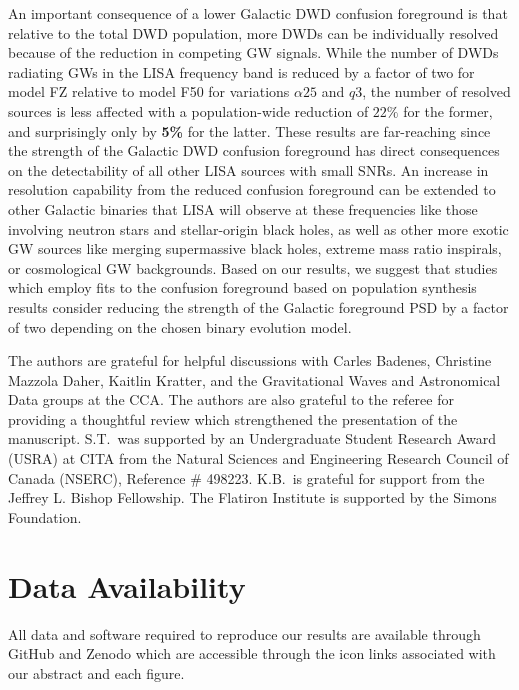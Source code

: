 \documentclass[twocolumn, linenumbers]{aastex631}
\begin{document}
An important consequence of a lower Galactic DWD confusion foreground is that relative to the total DWD population, more DWDs can be individually resolved because of the reduction in competing GW signals. While the number of DWDs radiating GWs in the LISA frequency band is reduced by a factor of two for model FZ relative to model F50 for variations $\alpha25$ and $q3$, the number of resolved sources is less affected with a population-wide reduction of \textbf{$22\%$} for the former, and surprisingly only by \textbf{5\%} for the latter. These results are far-reaching since the strength of the Galactic DWD confusion foreground has direct consequences on the detectability of all other LISA sources with small SNRs. An increase in resolution capability from the reduced confusion foreground can be extended to other Galactic binaries that LISA will observe at these frequencies like those involving neutron stars and stellar-origin black holes, as well as other more exotic GW sources like merging supermassive black holes, extreme mass ratio inspirals, or cosmological GW backgrounds. Based on our results, we suggest that studies which employ fits to the confusion foreground based on population synthesis results consider reducing the strength of the Galactic foreground PSD by a factor of two depending on the chosen binary evolution model.

\begin{acknowledgments}
The authors are grateful for helpful discussions with Carles Badenes, Christine Mazzola Daher, Kaitlin Kratter, and the Gravitational Waves and Astronomical Data groups at the CCA. The authors are also grateful to the referee for providing a thoughtful review which strengthened the presentation of the manuscript. S.T.\ was supported by an Undergraduate Student Research Award (USRA) at CITA from the Natural Sciences and Engineering Research Council of Canada (NSERC), Reference \# 498223. K.B.\ is grateful for support from the Jeffrey L. Bishop Fellowship. The Flatiron Institute is supported by the Simons Foundation.
\end{acknowledgments}

\section*{Data Availability}

All data and software required to reproduce our results are available through GitHub and Zenodo which are accessible through the icon links associated with our abstract and each figure.
\end{document}
